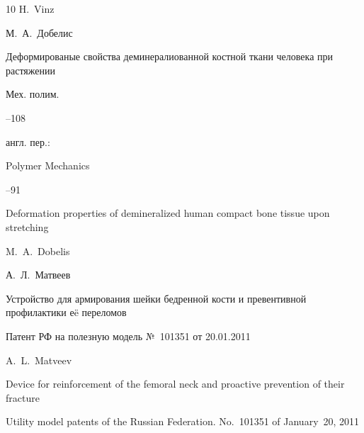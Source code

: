 \begin{thebibliography}{10}
\by H.~Vinz




\by М.~А.~Добелис

\paper Деформированые свойства деминералиованной костной ткани человека при растяжении

\jour Мех. полим.



--108

\transl англ. пер.:~

\jour Polymer Mechanics




--91

\paper Deformation properties of demineralized human compact bone tissue upon stretching

\by M.~A.~Dobelis 




\by А.~Л.~Матвеев

\thesis Устройство для армирования шейки бедренной кости и превентивной профилактики е\"e переломов

\thesisinfo Патент РФ на полезную модель №~101351 от 20.01.2011

\misctransl

\by A.~L.~Matveev

\thesis Device for reinforcement of the femoral neck and proactive prevention of their fracture

\thesisinfo Utility model patents of the Russian Federation. No.~101351 of January~20, 2011



\end{thebibliography}







\noindent

\hskip6.5cm \thedate \par\noindent

\hskip6.5cm\therevdate



\vspace{-10mm}





\makeengtitle



\newpage





%

